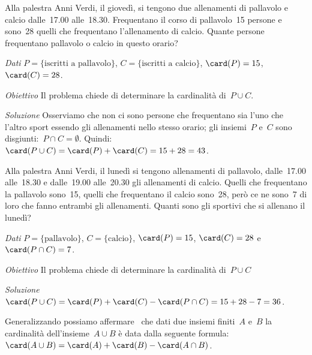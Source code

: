 {\begin{esempio}
\end{esempio}

\begin{esempio}
Alla palestra Anni Verdi, il giovedì, si tengono due allenamenti di 
pallavolo 
e calcio dalle~17.00 alle~18.30. Frequentano il corso di
pallavolo~15 persone e sono~28 quelli che frequentano l'allenamento di 
calcio. 
Quante persone frequentano pallavolo o calcio in questo orario?

\emph{Dati} \(P=\{\text{iscritti a pallavolo}\}\), \(C=\{\text{iscritti a 
calcio}\}\), \(\card(P)=15\), \(\card(C)=28\).

\emph{Obiettivo} Il problema chiede di determinare la cardinalità 
di~\(P\cup C\).

\emph{Soluzione} Osserviamo che non ci sono persone che frequentano sia
l'uno che l'altro sport essendo gli allenamenti nello stesso orario; gli 
insiemi~\(P\) e~\(C\) sono disgiunti:~\(P\cap C=\emptyset \). 
Quindi:~\(\card(P\cup C)=\card(P)+\card(C)=15+28=43\).
\end{esempio}

\begin{esempio}
\mbox{}

\begin{minipage}{.59 \textwidth}
 Alla palestra Anni Verdi, il lunedì si tengono allenamenti di pallavolo, 
 dalle~17.00 alle~18.30 e dalle~19.00 alle~20.30 gli allenamenti di calcio. 
 Quelli che frequentano la pallavolo sono~15, quelli che frequentano il 
calcio  sono~28, però ce ne sono~7 di loro che fanno entrambi gli 
allenamenti. 
 Quanti sono gli sportivi che si allenano il lunedì?
\end{minipage}
\hfill
\begin{minipage}{.39 \textwidth}
\begin{center}
 
 \end{center}
\end{minipage}

\emph{Dati} \(P=\{\text{pallavolo}\}\), 
 \(C=\{\text{calcio}\}\), \(\card(P)=15\), 
 \(\card(C)=28\) e~\(\card(P\cap C)=7\).
 
\emph{Obiettivo} Il problema chiede di determinare la cardinalità 
di~\(P\cup C\) 

\emph{Soluzione} 
 \(\card(P\cup C)=\card(P)+\card(C)-\card(P\cap C)=15+28-7=36\).

Generalizzando possiamo affermare \ che dati due insiemi finiti~\(A\) 
e~\(B\) la cardinalità dell'insieme~\(A\cup B\) è data dalla seguente 
formula: \(\card(A\cup B)=\card(A)+\card(B)-\card(A\cap B)\).
\end{esempio}

}

